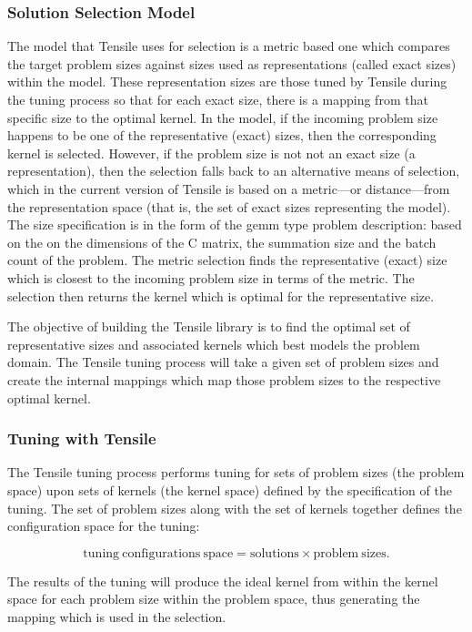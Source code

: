 \documentclass[]{article}
\begin{document}
\subsubsection{Solution Selection Model}

The model that Tensile uses for selection is a metric based one which compares the target problem sizes against sizes used as representations (called exact sizes) within the model. These representation sizes are those tuned by Tensile during the tuning process so that for each exact size, there is a mapping from that specific size to the optimal kernel. In the model, if the incoming problem size happens to be one of the representative (exact) sizes, then the corresponding kernel is selected. However, if the problem size is not not an exact size (a representation), then the selection falls back to an alternative means of selection, which in the current version of Tensile is based on a metric---or distance---from the representation space (that is, the set of exact sizes representing the model). The size specification is in the form of the gemm type problem description: based on the on the dimensions of the C matrix, the summation size and the batch count of the problem. The metric selection finds the representative (exact) size which is closest to the incoming problem size in terms of the metric. The selection then returns the kernel which is optimal for the representative size.

The objective of building the Tensile library is to find the optimal set of representative sizes and associated kernels which best models the problem domain. The Tensile tuning process will take a given set of problem sizes and create the internal mappings which map those problem sizes to the respective optimal kernel. 

\subsubsection{Tuning with Tensile}

The Tensile tuning process performs tuning for sets of problem sizes (the problem space) upon sets of kernels (the kernel space) defined by the specification of the tuning. The set of problem sizes along with the set of kernels together defines the configuration space for the tuning:

\begin{figure}[h]
	
	\[ \mathrm{tuning\ configurations\ space} = \mathrm{solutions} \times \mathrm{problem\ sizes}. \]
	
\end{figure}
\noindent
The results of the tuning will produce the ideal kernel from within the kernel space for each problem size within the problem space, thus generating the mapping which is used in the selection.
\end{document}
